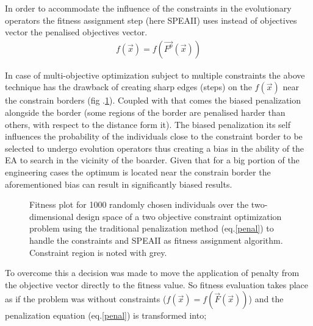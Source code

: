 In order to accommodate the influence of the constraints in the evolutionary operators the fitness assignment step (here SPEAII) uses instead of objectives vector the penalised objectives vector.  
\begin{eqnarray}
	f(\overrightarrow{x})=f(\overrightarrow{F^p}(\overrightarrow{x}))
\end{eqnarray}  

In case of multi-objective optimization subject to multiple constraints the above technique has the drawback of creating sharp edges (steps) on the $f(\overrightarrow{x})$ near the constrain borders (fig .\ref{fit1}). Coupled with that comes the biased penalization alongside the border (some regions of the border are penalised harder than others, with respect to the distance form it). The biased penalization its self influences the probability of the individuals close to the constraint border to be selected to undergo evolution operators thus creating a bias in the ability of the EA to search in the vicinity of the boarder. Given that for a big portion of the engineering cases the optimum is located near the constrain border the aforementioned bias can result in significantly biased results.


\begin{figure}[h!]
\begin{minipage}[b]{1.0\linewidth}
 \centering
\end{minipage}
\caption{Fitness plot for 1000 randomly chosen individuals over the two-dimensional design space of a two objective constraint optimization problem using the traditional penalization method (eq.\ref{penal}) to handle the constraints and SPEAII as fitness assignment algorithm. Constraint region is noted with grey.}
\label{fit1}
\end{figure}

To overcome this a decision was made to move the application of penalty from the objective vector directly to the fitness value. So fitness evaluation takes place as if the problem was without constraints ($f(\overrightarrow{x})=f(\overrightarrow{F}(\overrightarrow{x}))$) and the penalization equation (eq.\ref{penal}) is transformed into; 



